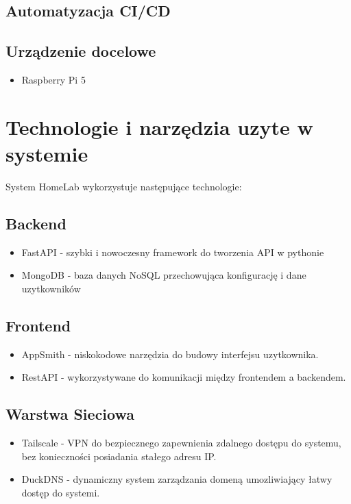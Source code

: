 \subsection{Automatyzacja CI/CD}

\subsection{Urządzenie docelowe}

\begin{itemize}
    \item Raspberry Pi 5
\end{itemize}



\section{Technologie i narzędzia uzyte w systemie}

System HomeLab wykorzystuje następujące technologie:
\subsection{Backend}
\begin{itemize}
    \item FastAPI - szybki i nowoczesny framework do tworzenia API w pythonie
    \item MongoDB - baza danych NoSQL przechowująca konfigurację i dane uzytkowników
\end{itemize}
\subsection{Frontend}
\begin{itemize}
    \item AppSmith - niskokodowe narzędzia do budowy interfejsu uzytkownika.
    \item RestAPI - wykorzystywane do komunikacji między frontendem a backendem.
\end{itemize}
\subsection{Warstwa Sieciowa}
\begin{itemize}
    \item Tailscale - VPN do bezpiecznego zapewnienia zdalnego dostępu do systemu, bez konieczności posiadania stałego adresu IP.
    \item DuckDNS - dynamiczny system zarządzania domeną umozliwiający łatwy dostęp do systemi.
\end{itemize}
